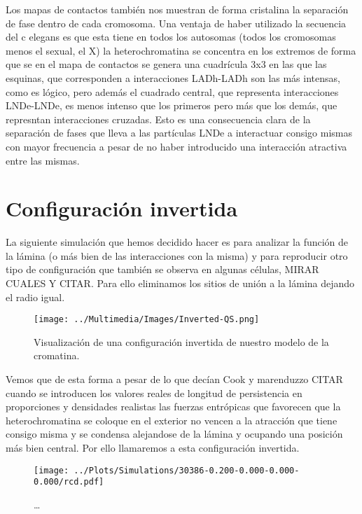 Los mapas de contactos también nos muestran de forma cristalina la separación de fase dentro de cada cromosoma. Una ventaja de haber utilizado la secuencia del c elegans es que esta tiene en todos los autosomas (todos los cromosomas menos el sexual, el X) la heterochromatina se concentra en los extremos de forma que se en el mapa de contactos se genera una cuadrícula 3x3 en las que las esquinas, que corresponden a interacciones LADh-LADh son las más intensas, como es lógico, pero además el cuadrado central, que representa interacciones LNDe-LNDe, es menos intenso que los primeros pero más que los demás, que represntan interacciones cruzadas. Esto es una consecuencia clara de la separación de fases que lleva a las partículas LNDe a interactuar consigo mismas con mayor frecuencia a pesar de no haber introducido una interacción atractiva entre las mismas.

\section{Configuración invertida}

La siguiente simulación que hemos decidido hacer es para analizar la función de la lámina (o más bien de las interacciones con la misma) y para reproducir otro tipo de configuración que también se observa en algunas células, MIRAR CUALES Y CITAR. Para ello eliminamos los sitios de unión a la lámina dejando el radio igual.

\begin{figure}
    \centering
    \texttt{[image: ../Multimedia/Images/Inverted-QS.png]}
    \caption{Visualización de una configuración invertida de nuestro modelo de la cromatina.}
    \label{fig:vmd_QS_image_i}
\end{figure}

Vemos que de esta forma a pesar de lo que decían Cook y marenduzzo CITAR cuando se introducen los valores reales de longitud de persistencia en proporciones y densidades realistas las fuerzas entrópicas que favorecen que la heterochromatina se coloque en el exterior no vencen a la atracción que tiene consigo misma y se condensa alejandose de la lámina y ocupando una posición más bien central. Por ello llamaremos a esta configuración invertida.

\begin{figure}
    \centering
    \texttt{[image: ../Plots/Simulations/30386-0.200-0.000-0.000-0.000/rcd.pdf]}
    \caption{\dots}
    \label{fig:rcd_i}
\end{figure}

